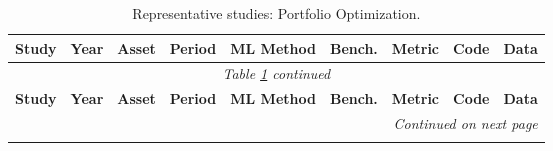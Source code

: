 \begin{longtable}{p{2.4cm} p{0.6cm} p{1.0cm} p{1.0cm} p{2.0cm} p{1.5cm} p{1.3cm} p{0.7cm} p{1.3cm}}
\caption{Representative studies: Portfolio Optimization.}\label{tab:master_portfolio} \\
\toprule
\textbf{Study} & \textbf{Year} & \textbf{Asset} & \textbf{Period} & \textbf{ML Method} & \textbf{Bench.} & \textbf{Metric} & \textbf{Code} & \textbf{Data} \\
\midrule
\endfirsthead
\multicolumn{9}{c}{\textit{Table \ref{tab:master_portfolio} continued}} \\
\toprule
\textbf{Study} & \textbf{Year} & \textbf{Asset} & \textbf{Period} & \textbf{ML Method} & \textbf{Bench.} & \textbf{Metric} & \textbf{Code} & \textbf{Data} \\
\midrule
\endhead
\midrule
\multicolumn{9}{r}{\textit{Continued on next page}} \\
\endfoot
\bottomrule
\endlastfoot


\end{longtable}
